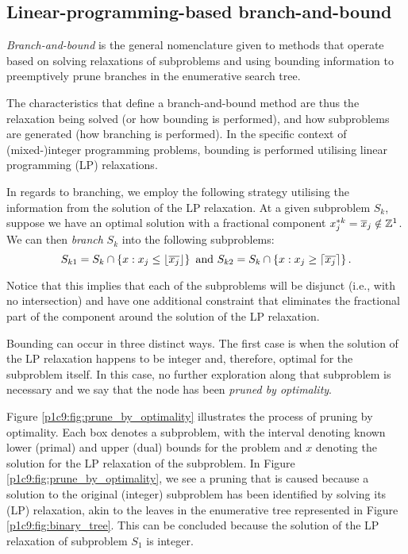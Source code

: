 \subsection{Linear-programming-based branch-and-bound}

\emph{Branch-and-bound} is the general nomenclature given to methods that operate based on solving relaxations of subproblems and using bounding information to preemptively prune branches in the enumerative search tree. 

The characteristics that define a branch-and-bound method are thus the relaxation being solved (or how bounding is performed), and how subproblems are generated (how branching is performed). In the specific context of (mixed-)integer programming problems, bounding is performed utilising linear programming (LP) relaxations. 

In regards to branching, we employ the following strategy utilising the information from the solution of the LP relaxation. At a given subproblem $S_k$, suppose we have an optimal solution with a fractional component $x^{*k}_j = \overline{x}_j \notin \mathbb{Z}^1$. We can then \emph{branch} $S_k$ into the following subproblems:
    \begin{equation*}
        S_{k1} = S_k \cap \left\{ x : x_j \leq \lfloor \overline{x_j} \rfloor \right \} \text{ and }
        S_{k2} = S_k \cap \left\{ x : x_j \geq \lceil \overline{x_j} \rceil \right \}.
    \end{equation*}
	
Notice that this implies that each of the subproblems will be disjunct (i.e., with no intersection) and have one additional constraint that eliminates the fractional part of the component around the solution of the LP relaxation. 

Bounding can occur in three distinct ways. The first case is when the solution of the LP relaxation happens to be integer and, therefore, optimal for the subproblem itself. In this case, no further exploration along that subproblem is necessary and we say that the node has been \emph{pruned by optimality}.

Figure \ref{p1c9:fig:prune_by_optimality} illustrates the process of pruning by optimality. Each box denotes a subproblem, with the interval denoting known lower (primal) and upper (dual) bounds for the problem and $x$ denoting the solution for the LP relaxation of the subproblem. In Figure \ref{p1c9:fig:prune_by_optimality}, we see a pruning that is caused because a solution to the original (integer) subproblem has been identified by solving its (LP) relaxation, akin to the leaves in the enumerative tree represented in Figure \ref{p1c9:fig:binary_tree}. This can be concluded because the solution of the LP relaxation of subproblem $S_1$ is integer. 


